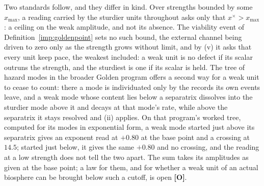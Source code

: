 Two standards follow, and they differ in kind. Over strengths bounded by
some $x_{\max}$, a reading carried by the sturdier units throughout asks
only that $x^\times>x_{\max}$: a ceiling on the weak amplitude, and not its
absence. The viability event of Definition~\ref{imp:goldenpoint} sets no
such bound, the external channel being driven to zero only as the
strength grows without limit, and by (v) it asks that every unit keep
pace, the weakest included: a weak unit is no defect if its scalar
outruns the strength, and the sturdiest is one if its scalar is held. The
tree of hazard modes in the broader Golden program offers a second way
for a weak unit to cease to count: there a mode is individuated only by
the records its own events leave, and a weak mode whose content lies
below a separatrix dissolves into the sturdier mode above it and decays at
that mode's rate, while above the separatrix it stays resolved and (ii)
applies. On that program's worked tree, computed for its modes in
exponential form, a weak mode started just above its separatrix gives an
exponent read at $+0.80$ at the base point and a crossing at $14.5$;
started just below, it gives the same $+0.80$ and no crossing, and the
reading at a low strength does not tell the two apart. The sum takes its
amplitudes as given at the base point; a law for them, and for whether a
weak unit of an actual biosphere can be brought below such a cutoff, is
open \textbf{[O]}.
